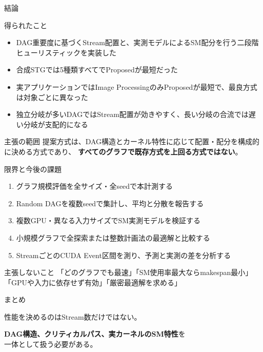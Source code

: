 \documentclass[aspectratio=169,10pt]{beamer}
\newcommand{\caution}[1]{\textcolor{warn}{\bfseries #1}}
\begin{document}
\begin{frame}{結論}
  \begin{block}{得られたこと}
    \begin{itemize}
      \item DAG重要度に基づくStream配置と、実測モデルによるSM配分を行う二段階ヒューリスティックを実装した
      \item 合成STGでは5種類すべてでProposedが最短だった
      \item 実アプリケーションではImage ProcessingのみProposedが最短で、最良方式は対象ごとに異なった
      \item 独立分岐が多いDAGではStream配置が効きやすく、長い分岐の合流では遅い分岐が支配的になる
    \end{itemize}
  \end{block}
  \begin{alertblock}{主張の範囲}
    提案方式は、DAG構造とカーネル特性に応じて配置・配分を構成的に決める方式であり、
    \caution{すべてのグラフで既存方式を上回る方式ではない}。
  \end{alertblock}
\end{frame}

\begin{frame}{限界と今後の課題}
  \begin{enumerate}
    \item グラフ規模評価を全サイズ・全seedで本計測する
    \item Random DAGを複数seedで集計し、平均と分散を報告する
    \item 複数GPU・異なる入力サイズでSM実測モデルを検証する
    \item 小規模グラフで全探索または整数計画法の最適解と比較する
    \item StreamごとのCUDA Event区間を測り、予測と実測の差を分析する
  \end{enumerate}
  \vspace{4mm}
  \begin{block}{主張しないこと}
    「どのグラフでも最速」「SM使用率最大ならmakespan最小」
    「GPUや入力に依存せず有効」「厳密最適解を求める」
  \end{block}
\end{frame}

\begin{frame}[plain]
  \centering
  \vfill
  {\LARGE まとめ}\par\medskip
  {\large 性能を決めるのはStream数だけではない。}\par\medskip
  {\large \textbf{DAG構造、クリティカルパス、実カーネルのSM特性}を\\
  一体として扱う必要がある。}
  \vfill
\end{frame}
\end{document}
